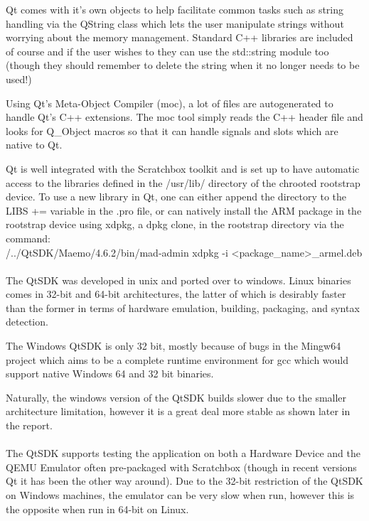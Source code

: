 Qt comes with it's own objects to help facilitate common tasks such as string handling via the QString class which lets the user manipulate strings without worrying about the memory management. Standard C++ libraries are included of course and if the user wishes to they can use the std::string module too (though they should remember to delete the string when it no longer needs to be used!)

Using Qt's Meta-Object Compiler (moc), a lot of files are autogenerated to handle Qt's C++ extensions. The moc tool simply reads the C++ header file and looks for Q\_Object macros so that it can handle signals and slots which are native to Qt.

Qt is well integrated with the Scratchbox toolkit and is set up to have automatic access to the libraries defined in the /usr/lib/ directory of the chrooted rootstrap device. To use a new library in Qt, one can either append the directory to the LIBS += variable in the .pro file, or can natively install the ARM package in the rootstrap device using xdpkg, a dpkg clone, in the rootstrap directory via the command:\\
/../QtSDK/Maemo/4.6.2/bin/mad-admin xdpkg -i <package\_name>\_armel.deb\\

\hspace{-20pt}{\bf Ubuntu vs Windows}\\
The QtSDK was developed in unix and ported over to windows. Linux binaries comes in 32-bit and 64-bit architectures, the latter of which is desirably faster than the former in terms of hardware emulation, building, packaging, and syntax detection.

The Windows QtSDK is only 32 bit, mostly because of bugs in the Mingw64 project which aims to be a complete runtime environment for gcc which would support native Windows 64 and 32 bit binaries.

Naturally, the windows version of the QtSDK builds slower due to the smaller architecture limitation, however it is a great deal more stable as shown later in the report.\\


\hspace{-20pt}{\bf Hardware Device, Emulator}\\
The QtSDK supports testing the application on both a Hardware Device and the QEMU Emulator often pre-packaged with Scratchbox (though in recent versions Qt it has been the other way around). Due to the 32-bit restriction of the QtSDK on Windows machines, the emulator can be very slow when run, however this is the opposite when run in 64-bit on Linux.

